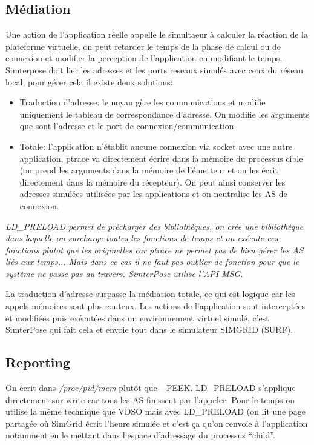 \documentclass{article}
\begin{document}
\subsection{Médiation}
Une action de l'application réelle appelle le simultaeur à calculer la réaction
de la plateforme virtuelle, on peut retarder le temps de la phase de calcul ou
de connexion et modifier la perception de l'application en modifiant le
temps. Simterpose doit lier les adresses et les ports reseaux simulés avec ceux
du réseau local, pour gérer cela il existe deux solutions:
\begin{itemize}
\item Traduction d'adresse: le noyau gère les communications et modifie
  uniquement le tableau de correspondance d'adresse. On modifie les arguments
  que sont l'adresse et le port de connexion/communication.
\item Totale: l'application n'établit aucune connexion via socket avec une autre
  application, ptrace va directement écrire dans la mémoire du processus cible
  (on prend les arguments dans la mémoire de l'émetteur et on les écrit
  directement dans la mémoire du récepteur). On peut ainsi conserver les
  adresses simulées utilisées par les applications et on neutralise les AS de
  connexion.
\end{itemize}

\textit{LD\_PRELOAD permet de précharger des bibliothèques, on crée une
  bibliothèque dans laquelle on surcharge toutes les fonctions de temps et on
  exécute ces fonctions plutot que les originelles car ptrace ne permet pas de
  bien gérer les AS liés aux temps... Mais dans ce cas il ne faut pas oublier de
  fonction pour que le système ne passe pas au travers. SimterPose utilise l'API
  MSG.}

La traduction d'adresse surpasse la médiation totale, ce qui est logique car les
appels mémoires sont plus couteux. Les actions de l'application sont
interceptées et modifiées puis exécutées dans un environnement virtuel simulé,
c'est SimterPose qui fait cela et envoie tout dans le simulateur SIMGRID (SURF).

\subsection{Reporting}
On écrit dans \textit{/proc/pid/mem} plutôt que \_PEEK. LD\_PRELOAD s'applique
directement sur write car tous les AS finissent par l'appeler. Pour le temps on
utilise la même technique que VDSO mais avec LD\_PRELOAD (on lit une page
partagée où SimGrid écrit l'heure simulée et c'est ça qu'on renvoie à
l'application notamment en le mettant dans l'espace d'adressage du processus
``child''.
\end{document}
